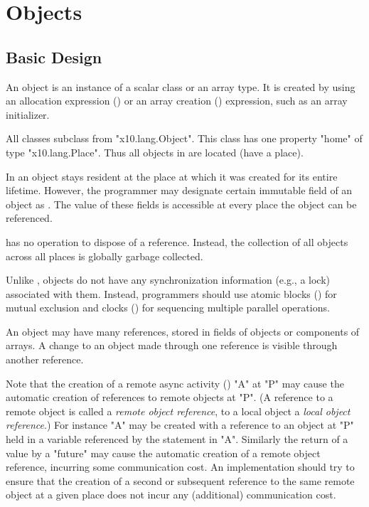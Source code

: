 \chapter{Objects}\label{XtenObjects}

\section{Basic Design}
An object is an instance of a scalar class or an array type.  It is
created by using an allocation expression
() or an array creation
() expression, such as an array
initializer. 

All classes subclass from \xcd"x10.lang.Object".
This class has one property \xcd"home" of type
\xcd"x10.lang.Place".  Thus all objects in \Xten{}
are located (have a place). 

In \XtenCurrVer{} an object stays resident at the place at
which it was created for its entire lifetime. However, the
programmer may designate certain immutable field of an object
as . The value of these fields is accessible 
at every place the object can be referenced.

{}\Xten{} has no operation to dispose of a reference.  Instead, the
collection of all objects across all places is globally garbage
collected.

Unlike \java{},
{}\Xten{} objects do not have any synchronization information (e.g.,
a lock) associated with them. 
Instead, programmers should use atomic blocks
() for mutual exclusion and clocks
() for sequencing multiple parallel operations.

An object may have many references, stored in fields of
objects or components of arrays. A change to an object made through
one reference is visible through another reference. 

Note that the creation of a remote async activity
() \xcd"A" at \xcd"P" may cause the automatic creation of
references to remote objects at \xcd"P". (A reference to a remote
object is called a {\em remote object reference}, to a local object a
{\em local object reference}.)  For instance \xcd"A" may be created
with a reference to an object at \xcd"P" held in a variable referenced
by the statement in \xcd"A".  Similarly the return of a value by a
\xcd"future" may cause the automatic creation of a remote object
reference, incurring some communication cost.  An {}\Xten{}
implementation should try to ensure that the creation of a second or
subsequent reference to the same remote object at a given place does
not incur any (additional) communication cost.

